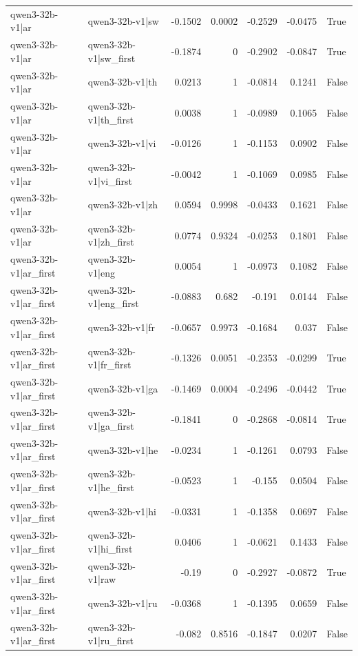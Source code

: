 \begin{table}
\begin{tabular}{l l r r r r l}
qwen3-32b-v1|ar & qwen3-32b-v1|sw & -0.1502 & 0.0002 & -0.2529 & -0.0475 & True \\
qwen3-32b-v1|ar & qwen3-32b-v1|sw_first & -0.1874 & 0 & -0.2902 & -0.0847 & True \\
qwen3-32b-v1|ar & qwen3-32b-v1|th & 0.0213 & 1 & -0.0814 & 0.1241 & False \\
qwen3-32b-v1|ar & qwen3-32b-v1|th_first & 0.0038 & 1 & -0.0989 & 0.1065 & False \\
qwen3-32b-v1|ar & qwen3-32b-v1|vi & -0.0126 & 1 & -0.1153 & 0.0902 & False \\
qwen3-32b-v1|ar & qwen3-32b-v1|vi_first & -0.0042 & 1 & -0.1069 & 0.0985 & False \\
qwen3-32b-v1|ar & qwen3-32b-v1|zh & 0.0594 & 0.9998 & -0.0433 & 0.1621 & False \\
qwen3-32b-v1|ar & qwen3-32b-v1|zh_first & 0.0774 & 0.9324 & -0.0253 & 0.1801 & False \\
qwen3-32b-v1|ar_first & qwen3-32b-v1|eng & 0.0054 & 1 & -0.0973 & 0.1082 & False \\
qwen3-32b-v1|ar_first & qwen3-32b-v1|eng_first & -0.0883 & 0.682 & -0.191 & 0.0144 & False \\
qwen3-32b-v1|ar_first & qwen3-32b-v1|fr & -0.0657 & 0.9973 & -0.1684 & 0.037 & False \\
qwen3-32b-v1|ar_first & qwen3-32b-v1|fr_first & -0.1326 & 0.0051 & -0.2353 & -0.0299 & True \\
qwen3-32b-v1|ar_first & qwen3-32b-v1|ga & -0.1469 & 0.0004 & -0.2496 & -0.0442 & True \\
qwen3-32b-v1|ar_first & qwen3-32b-v1|ga_first & -0.1841 & 0 & -0.2868 & -0.0814 & True \\
qwen3-32b-v1|ar_first & qwen3-32b-v1|he & -0.0234 & 1 & -0.1261 & 0.0793 & False \\
qwen3-32b-v1|ar_first & qwen3-32b-v1|he_first & -0.0523 & 1 & -0.155 & 0.0504 & False \\
qwen3-32b-v1|ar_first & qwen3-32b-v1|hi & -0.0331 & 1 & -0.1358 & 0.0697 & False \\
qwen3-32b-v1|ar_first & qwen3-32b-v1|hi_first & 0.0406 & 1 & -0.0621 & 0.1433 & False \\
qwen3-32b-v1|ar_first & qwen3-32b-v1|raw & -0.19 & 0 & -0.2927 & -0.0872 & True \\
qwen3-32b-v1|ar_first & qwen3-32b-v1|ru & -0.0368 & 1 & -0.1395 & 0.0659 & False \\
qwen3-32b-v1|ar_first & qwen3-32b-v1|ru_first & -0.082 & 0.8516 & -0.1847 & 0.0207 & False \\

\end{tabular}
\end{table}
